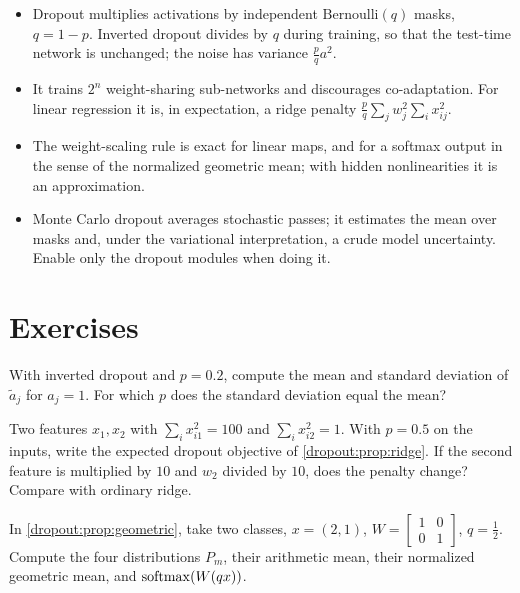 \begin{notechapter}
\begin{chaptersummary}
\begin{itemize}[nosep]
  \item Dropout multiplies activations by independent $\mathrm{Bernoulli}(q)$ masks, $q = 1 - p$. Inverted dropout divides by
        $q$ during training, so that the test-time network is unchanged; the noise has variance $\frac pqa^2$.
  \item It trains $2^n$ weight-sharing sub-networks and discourages co-adaptation. For linear
        regression it is, in expectation, a ridge penalty $\frac pq\sum_jw_j^2\sum_ix_{ij}^2$.
  \item The weight-scaling rule is exact for linear maps, and for a softmax output in the sense
        of the normalized geometric mean; with hidden nonlinearities it is an approximation.
  \item Monte Carlo dropout averages stochastic passes; it estimates the mean over masks and,
        under the variational interpretation, a crude model uncertainty. Enable only the dropout
        modules when doing it.
\end{itemize}
\end{chaptersummary}

\section*{Exercises}

\begin{exercise}\label{dropout:exr:1}
With inverted dropout and $p = 0.2$, compute the mean and standard deviation of $\tilde a_j$ for $a_j = 1$. For
which $p$ does the standard deviation equal the mean?
\end{exercise}

\begin{exercise}\label{dropout:exr:2}
Two features $x_1, x_2$ with $\sum_ix_{i1}^2 = 100$ and $\sum_ix_{i2}^2 = 1$. With $p = 0.5$ on the inputs, write the expected
dropout objective of \cref{dropout:prop:ridge}. If the second feature is multiplied by $10$ and $w_2$ divided
by $10$, does the penalty change? Compare with ordinary ridge.
\end{exercise}

\begin{exercise}\label{dropout:exr:3}
In \cref{dropout:prop:geometric}, take two classes, $x = (2,1)$, $W = \begin{bmatrix}1&0\\0&1\end{bmatrix}$, $q = \frac12$. Compute the four
distributions $P_m$, their arithmetic mean, their normalized geometric mean, and
$\operatorname{softmax}(W(qx))$.
\end{exercise}


\end{notechapter}
